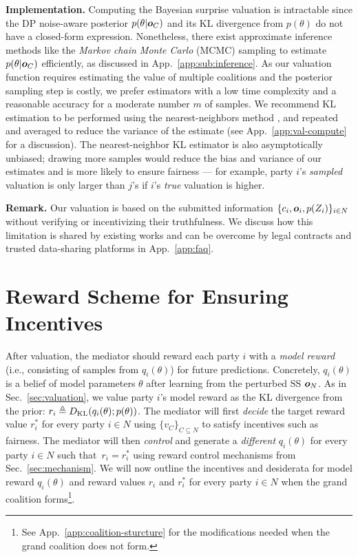 \documentclass{article}
\theoremstyle{plain}
\theoremstyle{definition}
\theoremstyle{remark}
\begin{document}
\textbf{Implementation.} Computing the Bayesian surprise valuation is intractable since the DP noise-aware posterior $p(\theta | {\bm{o}}_C)$ and its KL divergence from $p(\theta)$ do not have a closed-form expression. Nonetheless, there exist approximate inference methods like the \emph{Markov chain Monte Carlo} (MCMC) sampling to estimate $p(\theta | {\bm{o}}_C)$ efficiently, as discussed in App.~\ref{app:sub:inference}.
As our valuation function requires estimating the value of multiple coalitions and the posterior sampling step is costly, we prefer estimators with a low time complexity and a reasonable accuracy for a moderate number $m$ of samples. We recommend  KL estimation to be performed using the nearest-neighbors method \cite{perez2008kl}, and repeated and averaged to reduce the variance of the estimate (see App.~\ref{app:val-compute} for a discussion). The nearest-neighbor KL estimator is also asymptotically unbiased; drawing more samples would reduce the bias and variance of our estimates and is more likely to ensure fairness --- for example, party $i$'s \emph{sampled} valuation is only larger than $j$'s if $i$'s \emph{true} valuation is higher.

\textbf{Remark.} Our valuation is based on the submitted information $\{c_i, {\bm{o}}_i, p(Z_i)\}_{i \in N}$ without verifying or incentivizing their truthfulness. We discuss how this limitation is shared by existing works and can be overcome by legal contracts and trusted data-sharing platforms in App.~\ref{app:faq}.

\section{Reward Scheme for Ensuring Incentives}
\label{sec:incentives}

After valuation, the mediator should reward each party $i$ with a \emph{model reward} (i.e., consisting of samples from $q_i(\theta)$) for future predictions. Concretely, $q_i(\theta)$ is a belief of model parameters $\theta$ after learning from the perturbed SS ${\bm{o}}_N$.
As in Sec.~\ref{sec:valuation}, we value party $i$'s model reward as the KL divergence from the prior: $r_i \triangleq D_{\mathrm{KL}}\hspace{-0.5mm}\left(q_i(\theta); p(\theta)\right)$.
The mediator will first \emph{decide} the target reward value $r^*_i$ for every party $i \in N$ using $\{v_C\}_{C \subseteq N}$ to satisfy incentives such as fairness.
The mediator will then \emph{control} and generate a \emph{different} $q_i(\theta)$ for every party $i\in N$ such that~$r_i = r^*_i$ using reward control mechanisms from Sec.~\ref{sec:mechanism}.
We will now outline the incentives and desiderata for model reward $q_i(\theta)$ and reward values $r_i$ and $r^*_i$ for every party $i \in N$%
when the grand coalition forms\footnote{See App.~\ref{app:coalition-sturcture} for the modifications needed when the grand coalition does not form.}.
\end{document}
